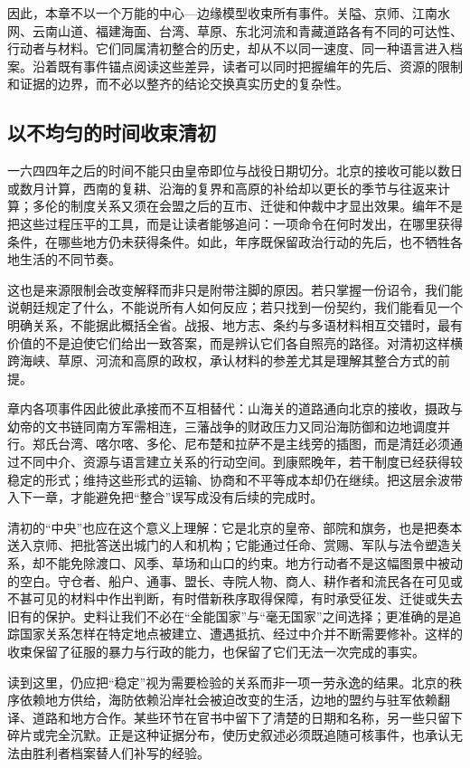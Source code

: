 因此，本章不以一个万能的中心—边缘模型收束所有事件。关隘、京师、江南水网、云南山道、福建海面、台湾、草原、东北河流和青藏道路各有不同的可达性、行动者与材料。它们同属清初整合的历史，却从不以同一速度、同一种语言进入档案。沿着既有事件锚点阅读这些差异，读者可以同时把握编年的先后、资源的限制和证据的边界，而不必以整齐的结论交换真实历史的复杂性。


\subsection*{以不均匀的时间收束清初}

一六四四年之后的时间不能只由皇帝即位与战役日期切分。北京的接收可能以数日或数月计算，西南的复耕、沿海的复界和高原的补给却以更长的季节与往返来计算；多伦的制度关系又须在会盟之后的互市、迁徙和仲裁中才显出效果。编年不是把这些过程压平的工具，而是让读者能够追问：一项命令在何时发出，在哪里获得条件，在哪些地方仍未获得条件。如此，年序既保留政治行动的先后，也不牺牲各地生活的不同节奏。

这也是来源限制会改变解释而非只是附带注脚的原因。若只掌握一份诏令，我们能说朝廷规定了什么，不能说所有人如何反应；若只找到一份契约，我们能看见一个明确关系，不能据此概括全省。战报、地方志、条约与多语材料相互交错时，最有价值的不是迫使它们给出一致答案，而是辨认它们各自照亮的路径。对清初这样横跨海峡、草原、河流和高原的政权，承认材料的参差尤其是理解其整合方式的前提。

章内各项事件因此彼此承接而不互相替代：山海关的道路通向北京的接收，摄政与幼帝的文书链同南方军需相连，三藩战争的财政压力又同沿海防御和边地调度并行。郑氏台湾、喀尔喀、多伦、尼布楚和拉萨不是主线旁的插图，而是清廷必须通过不同中介、资源与语言建立关系的行动空间。到康熙晚年，若干制度已经获得较稳定的形式；维持这些形式的运输、协商和不平等成本却仍在继续。把这层余波带入下一章，才能避免把“整合”误写成没有后续的完成时。


清初的“中央”也应在这个意义上理解：它是北京的皇帝、部院和旗务，也是把奏本送入京师、把批答送出城门的人和机构；它能通过任命、赏赐、军队与法令塑造关系，却不能免除渡口、风季、草场和山口的约束。地方行动者不是这幅图景中被动的空白。守仓者、船户、通事、盟长、寺院人物、商人、耕作者和流民各在可见或不甚可见的材料中作出判断，有时借新秩序取得保障，有时承受征发、迁徙或失去旧有的保护。史料让我们不必在“全能国家”与“毫无国家”之间选择；更准确的是追踪国家关系怎样在特定地点被建立、遭遇抵抗、经过中介并不断需要修补。这样的收束保留了征服的暴力与行政的能力，也保留了它们无法一次完成的事实。


读到这里，仍应把“稳定”视为需要检验的关系而非一项一劳永逸的结果。北京的秩序依赖地方供给，海防依赖沿岸社会被迫改变的生活，边地的盟约与驻军依赖翻译、道路和地方合作。某些环节在官书中留下了清楚的日期和名称，另一些只留下碎片或完全沉默。正是这种证据分布，使历史叙述必须既追随可核事件，也承认无法由胜利者档案替人们补写的经验。


